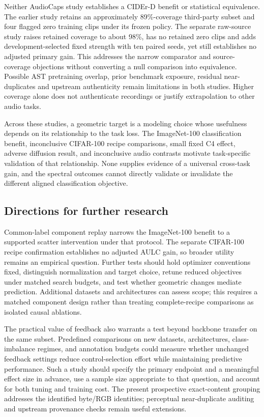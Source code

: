 \documentclass[10pt,a4paper,twocolumn]{article}
\begin{document}
Neither AudioCaps study establishes a CIDEr-D benefit or statistical
equivalence. The earlier study retains an approximately 89\%-coverage
third-party subset and four flagged zero training clips under its frozen
policy. The separate raw-source study raises retained coverage to about
98\%, has no retained zero clips and adds development-selected fixed
strength with ten paired seeds, yet still establishes no adjusted
primary gain. This addresses the narrow comparator and source-coverage
objections without converting a null comparison into equivalence.
Possible AST pretraining overlap, prior benchmark exposure, residual
near-duplicates and upstream authenticity remain limitations in both
studies. Higher coverage alone does not authenticate recordings or
justify extrapolation to other audio tasks.

Across these studies, a geometric target is a modeling choice whose
usefulness depends on its relationship to the task loss. The ImageNet-100
classification benefit, inconclusive CIFAR-100 recipe comparisons,
small fixed C4 effect, adverse diffusion result,
and inconclusive audio contrasts motivate task-specific validation of
that relationship. None supplies evidence of a universal cross-task
gain, and the spectral outcomes cannot directly validate or invalidate
the different aligned classification objective.

\subsection{Directions for further research}
\label{sec:future_directions}

Common-label component replay narrows the ImageNet-100 benefit to
a supported scatter intervention under that protocol. The separate
CIFAR-100 recipe confirmation establishes no adjusted AULC gain,
so broader utility remains an empirical question. Further tests
should hold optimizer conventions fixed, distinguish normalization
and target choice, retune reduced objectives under matched search
budgets, and test whether geometric changes mediate prediction.
Additional datasets and architectures can assess scope; this requires
a matched component design rather than treating complete-recipe
comparisons as isolated causal ablations.

The practical value of feedback also warrants a test beyond backbone
transfer on the same subset. Predefined comparisons on new datasets,
architectures, class-imbalance regimes, and annotation budgets could
measure whether unchanged feedback settings reduce control-selection
effort while maintaining predictive performance. Such a study should
specify the primary endpoint and a meaningful effect size in advance,
use a sample size appropriate to that question, and account for both
tuning and training cost. The present prospective exact-content grouping
addresses the identified byte/RGB identities; perceptual near-duplicate
auditing and upstream provenance checks remain useful extensions.
\end{document}
